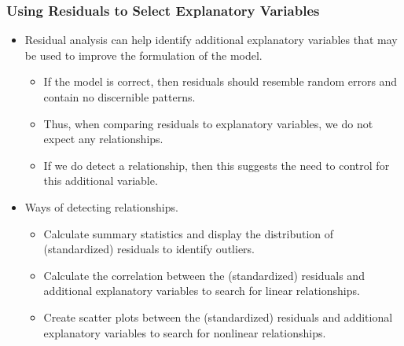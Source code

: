 \begin{frame}%
 \frametitle{Using Residuals to Select Explanatory
Variables}
 \begin{itemize}
   \item Residual analysis can help identify
additional explanatory variables that may be used to improve the
formulation of the model.
 \begin{itemize}
   \item If the model is correct, then residuals should
resemble random errors and contain no discernible patterns.
\item Thus,
when comparing residuals to explanatory variables, we do not expect
any relationships.
\item If we do detect a relationship, then this
suggests the need to control for this additional variable.
   \end{itemize}
\item Ways of detecting relationships.
 \begin{itemize}

 \item Calculate summary statistics and display the distribution of
(standardized) residuals to identify outliers.

\item  Calculate the correlation between the (standardized) residuals and
additional explanatory variables to search for linear relationships.

\item  Create scatter plots between the (standardized) residuals and additional
explanatory variables to search for nonlinear relationships.

    \end{itemize}
    \end{itemize}
\end{frame}


